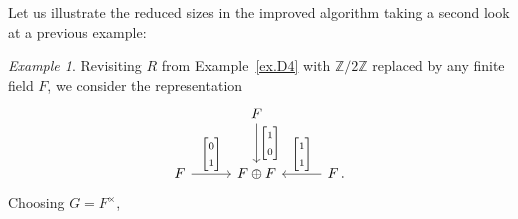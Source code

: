 \documentclass[a4paper]{amsart}
\theoremstyle{plain}
\theoremstyle{definition}
\theoremstyle{remark}
\newtheorem{example}[theorem]{Example}
\newcommand{\funct}[1]{\operatorname{\mathtt{#1}}}
\newcommand{\Z}{\mathbb{Z}}
\begin{document}
Let us illustrate the reduced sizes in the improved algorithm taking a second look at a previous example:

\begin{example} \label{example:D4_by_G-set}
Revisiting $R$ from Example~\ref{ex.D4} with $\Z/2\Z$ replaced by any finite field $F$,
%
we consider the representation
\[ \begin{tikzcd}[sep=10mm]
& F\ar{d}{\begin{bmatrix} 1 \\ 0 \end{bmatrix}} & \\
F \ar{r}{\begin{bmatrix} 0 \\ 1 \end{bmatrix}} & F \oplus F & F \, . \ar{l}[swap]{\begin{bmatrix} 1 \\ 1 \end{bmatrix}} 
\end{tikzcd} \]
Choosing $G = F^\times$,

\end{example}
\end{document}
